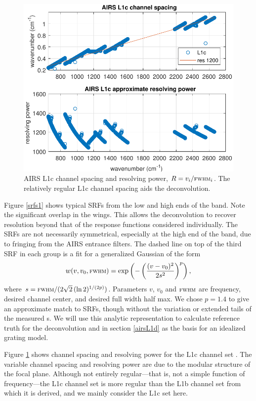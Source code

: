 \documentclass[journal]{IEEEtran}
\begin{document}
\begin{figure} %
  \centering
  \includegraphics[width=\linewidth]{figures/airs_L1c_res.pdf}
  \caption{AIRS L1c channel spacing and resolving power, $R =
    v_i/\mbox{\small\textsc{fwhm}}_i$.  The relatively regular L1c channel spacing aids
    the deconvolution.}
  \label{chan1}
\end{figure}

Figure \ref{srfs1} shows typical {\airs} SRFs from the low and high
ends of the band.  Note the significant overlap in the wings.  This
allows the deconvolution to recover resolution beyond that of
the response functions considered individually.  The SRFs are not
necessarily symmetrical, especially at the high end of the band, due
to fringing from the AIRS entrance filters.  The dashed line on top of
the third SRF in each group is a fit for a generalized Gaussian
\cite{wiki:gauss} of the form
\[w(v, v_0, \mbox{\small\textsc{fwhm}}) = 
\exp\left(-\left(\frac{(v - v_0)^2}{2s^2}\right)^p\right), \] where
$s=\mbox{\small\textsc{fwhm}} / (2\sqrt{2}\,(\ln 2)^{1/(2p)})$.  Parameters $v$, $v_0$
and $\mbox{\small\textsc{fwhm}}$ are frequency, desired channel center, and desired full
width half max.  We chose $p = 1.4$ to give an approximate match to
{\airs} SRFs, though without the variation or extended tails of the
measured \srf s.  We will use this analytic representation to
calculate reference truth for the deconvolution and in section
\ref{airsL1d} as the basis for an idealized grating model.


Figure \ref{chan1} shows channel spacing and resolving power for the
{\airs} L1c channel set \cite{a1c:atbd}.  The variable channel
spacing and resolving power are due to the modular structure of the
focal plane.  Although not entirely regular---that is, not a simple
function of frequency---the L1c channel set is more regular than the
L1b channel set from which it is derived, and we mainly consider the
L1c set here.
\end{document}
